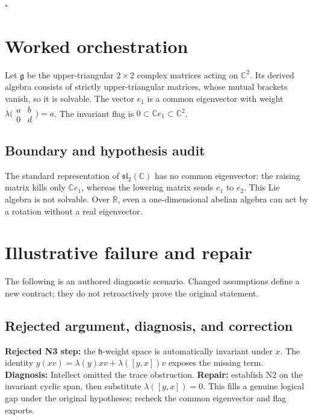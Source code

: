 \documentclass[preprint,12pt,aps,pra,showkeys,amsmath,amssymb,superscriptaddress,floatfix]{revtex4-2}
\theoremstyle{definition}
\theoremstyle{remark}
\begin{document}
\hfill$\square$

\section{Worked orchestration}

Let \(\mathfrak g\) be the upper-triangular \(2\times2\) complex
matrices acting on \(\mathbb C^2\). Its derived algebra consists of
strictly upper-triangular matrices, whose mutual brackets vanish, so it
is solvable. The vector \(e_1\) is a common eigenvector with weight
\(\lambda\bigl(\begin{smallmatrix}a&b\\0&d\end{smallmatrix}\bigr)=a\).
The invariant flag is \(0\subset\mathbb Ce_1\subset\mathbb C^2\).

\subsection{Boundary and hypothesis audit}

The standard representation of \(\mathfrak{sl}_2(\mathbb C)\) has no
common eigenvector: the raising matrix kills only \(\mathbb Ce_1\),
whereas the lowering matrix sends \(e_1\) to \(e_2\). This Lie algebra
is not solvable. Over \(\mathbb R\), even a one-dimensional abelian
algebra can act by a rotation without a real eigenvector.

\section{Illustrative failure and repair}

The following is an authored diagnostic scenario. Changed assumptions
define a new contract; they do not retroactively prove the original
statement.

\subsection{Rejected argument, diagnosis, and correction}
\textbf{Rejected N3 step:} the \(\mathfrak h\)-weight space is
automatically invariant under \(x\). The identity
\(y(xv)=\lambda(y)xv+\lambda([y,x])v\) exposes the missing term.
\textbf{Diagnosis:} Intellect omitted the trace obstruction.
\textbf{Repair:} establish N2 on the invariant cyclic span, then
substitute \(\lambda([y,x])=0\). This fills a genuine logical gap under
the original hypotheses; recheck the common eigenvector and flag
exports.
\end{document}
